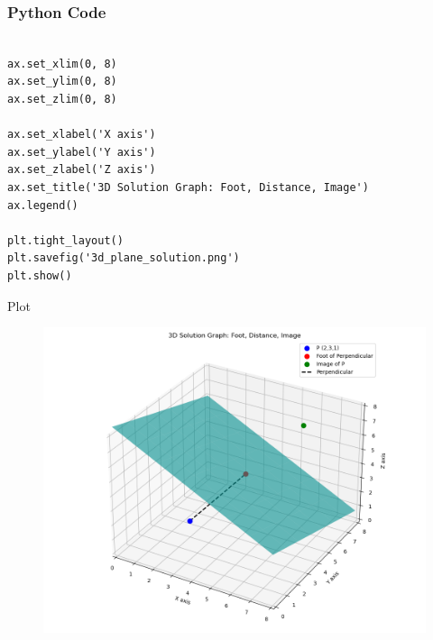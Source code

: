 \documentclass{beamer}
\begin{document}
\begin{frame}[fragile]
    \frametitle{Python Code}
    \begin{lstlisting}

ax.set_xlim(0, 8)
ax.set_ylim(0, 8)
ax.set_zlim(0, 8)

ax.set_xlabel('X axis')
ax.set_ylabel('Y axis')
ax.set_zlabel('Z axis')
ax.set_title('3D Solution Graph: Foot, Distance, Image')
ax.legend()

plt.tight_layout()
plt.savefig('3d_plane_solution.png')
plt.show()
    \end{lstlisting}
\end{frame}
  
\begin{frame}{Plot}

\begin{figure}
    \centering
    \includegraphics[width=0.8\linewidth]{Beamer/figs/3d_plane_solution.png}
    \caption{}
    \label{fig:placeholder}
\end{figure}

\end{frame}
\end{document}
